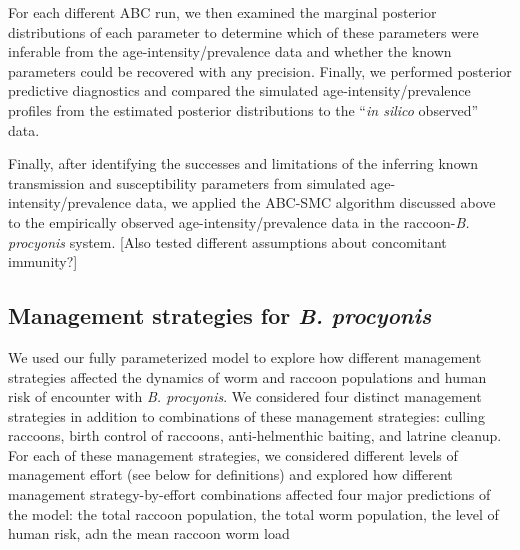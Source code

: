 \documentclass[11pt]{article}
\begin{document}
For each different ABC run, we then examined the marginal posterior distributions of each parameter to determine which of these parameters were inferable from the age-intensity/prevalence data and whether the known parameters could be recovered with any precision. Finally, we performed posterior predictive diagnostics and compared the simulated age-intensity/prevalence profiles from the estimated posterior distributions to the ``\emph{in silico} observed'' data.

Finally, after identifying the successes and limitations of the inferring known transmission and susceptibility parameters from simulated age-intensity/prevalence data, we applied the ABC-SMC algorithm discussed above to the empirically observed age-intensity/prevalence data in the raccoon-\emph{B. procyonis} system. [Also tested different assumptions about concomitant immunity?]


\subsection{Management strategies for \emph{B. procyonis}}

We used our fully parameterized model to explore how different
management strategies affected the dynamics of worm and raccoon
populations and human risk of encounter with \emph{B. procyonis}. We considered four
distinct management strategies in addition to combinations of these
management strategies: culling raccoons, birth control of raccoons,
anti-helmenthic baiting, and latrine cleanup. For each of these
management strategies, we considered different levels of management
effort (see below for definitions) and explored how different management
strategy-by-effort combinations affected four major predictions of the
model: the total raccoon population, the total worm population, the level of human risk, adn the mean raccoon worm load
\end{document}
